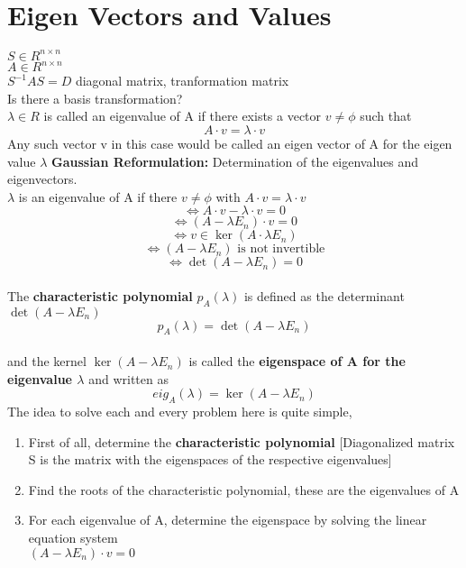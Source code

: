 \documentclass{article}
\begin{document}
\section*{Eigen Vectors and Values}
$S \in R^{n\times n}$ \\
$A \in R^{n \times n}$ \\
$S^{-1}AS = D$ diagonal matrix, tranformation matrix \\
Is there a basis transformation? \\ 
$\lambda \in R$ is called an eigenvalue of A if there exists a vector $v \neq \phi$ such that \begin{equation*} A \cdot v = \lambda \cdot v \end{equation*}
Any such vector v in this case would be called an eigen vector of A for the eigen value $\lambda$
\textbf{Gaussian Reformulation:} Determination of the eigenvalues and eigenvectors. \\
$\lambda$ is an eigenvalue of A if there $v\neq\phi$ with $A\cdot v = \lambda \cdot v$
\begin{equation*}
    \Leftrightarrow A\cdot v - \lambda \cdot v = 0 \end{equation*}
\begin{equation*}\Leftrightarrow (A-\lambda E_n) \cdot v = 0 \end{equation*}
\begin{equation*} \Leftrightarrow v \in \ker(A\cdot\lambda E_n) \end{equation*}
\begin{equation*}\Leftrightarrow (A-\lambda E_n) \text{  is not invertible} \end{equation*}
\begin{equation*} \Leftrightarrow \det(A-\lambda E_n) = 0 
\end{equation*} \\[2pt]
The \textbf{characteristic polynomial} $p_A(\lambda)$ is defined as the determinant $\det(A-\lambda E_n)$ \begin{equation*} p_A(\lambda) = \det(A-\lambda E_n) \end{equation*} \\ and the kernel $\ker(A-\lambda E_n)$ is called the \textbf{eigenspace of A for the eigenvalue $\lambda$} and written as \begin{equation*} eig_A(\lambda) = \ker(A-\lambda E_n) \end{equation*}
The idea to solve each and every problem here is quite simple,
\begin{enumerate}
    \item First of all, determine the \textbf{characteristic polynomial} [Diagonalized matrix S is the matrix with the eigenspaces of the respective eigenvalues]
    \item Find the roots of the characteristic polynomial, these are the eigenvalues of A
    \item For each eigenvalue of A, determine the eigenspace by solving the linear equation system \\ $(A-\lambda E_n) \cdot v = 0$ 
\end{enumerate}
\end{document}
